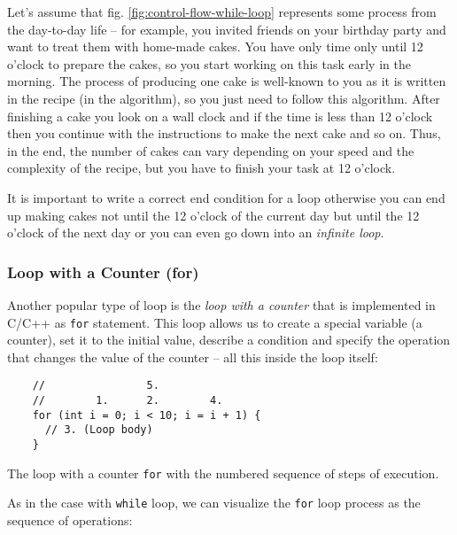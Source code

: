 \documentclass[../sparc.tex]{subfiles}
\begin{document}
Let's assume that fig. \ref{fig:control-flow-while-loop} represents some process
from the day-to-day life -- for example, you invited friends on your birthday
party and want to treat them with home-made cakes.  You have only time only
until 12 o'clock to prepare the cakes, so you start working on this task early
in the morning.  The process of producing one cake is well-known to you as it is
written in the recipe (in the algorithm), so you just need to follow this
algorithm.  After finishing a cake you look on a wall clock and if the time is
less than 12 o'clock then you continue with the instructions to make the next
cake and so on.  Thus, in the end, the number of cakes can vary depending on
your speed and the complexity of the recipe, but you have to finish your task at
12 o'clock.

It is important to write a correct end condition for a loop otherwise you can
end up making cakes not until the 12 o'clock of the current day but until the 12
o'clock of the next day or you can even go down into an \emph{infinite loop}.

\subsubsection{Loop with a Counter (for)}

Another popular type of loop is the \emph{loop with a counter} that is
implemented in C/C++ as \texttt{for} statement.  This loop allows us to create a
special variable (a counter), set it to the initial value, describe a condition
and specify the operation that changes the value of the counter -- all this
inside the loop itself:

\begin{listing}[ht]
  \begin{verbatim}
    //                5.
    //        1.      2.        4.
    for (int i = 0; i < 10; i = i + 1) {
      // 3. (Loop body)
    }
  \end{verbatim}
  \label{listing:dialogues-with-computer-for}
  \caption{The loop with a counter \texttt{for} with the numbered sequence of
    steps of execution.}
\end{listing}

As in the case with \texttt{while} loop, we can visualize the \texttt{for} loop
process as the sequence of operations:
\end{document}
